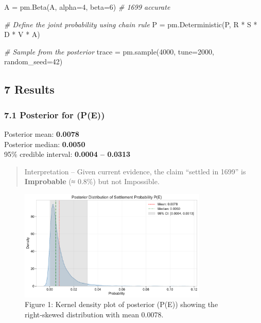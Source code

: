\documentclass[
  11pt,
]{article}
\newenvironment{Shaded}{}{}
\newcommand{\CommentTok}[1]{\textcolor[rgb]{0.38,0.63,0.69}{\textit{#1}}}
\newcommand{\DecValTok}[1]{\textcolor[rgb]{0.25,0.63,0.44}{#1}}
\newcommand{\NormalTok}[1]{#1}
\newcommand{\OperatorTok}[1]{\textcolor[rgb]{0.40,0.40,0.40}{#1}}
\newcommand{\StringTok}[1]{\textcolor[rgb]{0.25,0.44,0.63}{#1}}
\begin{document}
\begin{Shaded}
\begin{Highlighting}[]
\NormalTok{    A }\OperatorTok{=}\NormalTok{ pm.Beta(}\StringTok{\textquotesingle{}A\textquotesingle{}}\NormalTok{, alpha}\OperatorTok{=}\DecValTok{4}\NormalTok{, beta}\OperatorTok{=}\DecValTok{6}\NormalTok{)         }\CommentTok{\# 1699 accurate}
    
    \CommentTok{\# Define the joint probability using chain rule}
\NormalTok{    P }\OperatorTok{=}\NormalTok{ pm.Deterministic(}\StringTok{\textquotesingle{}P\textquotesingle{}}\NormalTok{, R }\OperatorTok{*}\NormalTok{ S }\OperatorTok{*}\NormalTok{ D }\OperatorTok{*}\NormalTok{ V }\OperatorTok{*}\NormalTok{ A)}
    
    \CommentTok{\# Sample from the posterior}
\NormalTok{    trace }\OperatorTok{=}\NormalTok{ pm.sample(}\DecValTok{4000}\NormalTok{, tune}\OperatorTok{=}\DecValTok{2000}\NormalTok{, random\_seed}\OperatorTok{=}\DecValTok{42}\NormalTok{)}
\end{Highlighting}
\end{Shaded}

\subsection{7 Results}\label{results}

\subsubsection{7.1 Posterior for (P(E))}\label{posterior-for-pe}

Posterior mean: \textbf{0.0078}\\
Posterior median: \textbf{0.0050}\\
95\% credible interval: \textbf{0.0004 -- 0.0313}

\begin{quote}
Interpretation -- Given current evidence, the claim ``settled in 1699''
is \textbf{Improbable} (≈ 0.8\%) but not Impossible.
\end{quote}

\begin{figure}
\centering
\includegraphics[width=0.8\textwidth]{figures/posterior_density.pdf}
\caption{Figure 1: Kernel density plot of posterior (P(E)) showing the
right‑skewed distribution with mean 0.0078.}
\end{figure}
\end{document}
